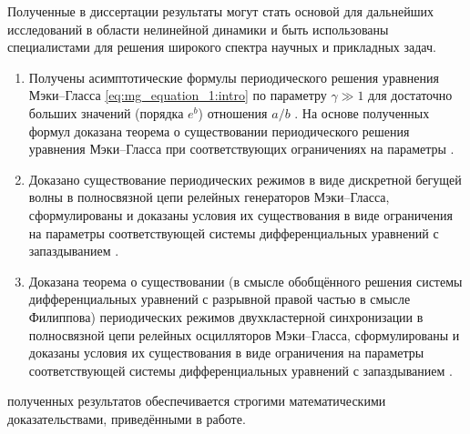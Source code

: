 {\influence} Полученные в диссертации результаты могут стать основой для дальнейших исследований в области нелинейной динамики и быть использованы специалистами для решения широкого спектра научных и прикладных задач.

{}
\begin{enumerate}[beginpenalty=10000] %
	\item Получены асимптотические формулы периодического решения уравнения Мэки--Гласса \eqref{eq:mg_equation_1:intro} по параметру $\gamma \gg 1$ для достаточно больших значений (порядка $e^b$) отношения $a / b$ \cite[Теорема 5.6]{wosbib1}. На основе полученных формул доказана теорема о существовании периодического решения уравнения Мэки--Гласса при соответствующих ограничениях на параметры \cite[Теорема 3.2]{wosbib1}.
	\item Доказано существование периодических режимов в виде дискретной бегущей волны в полносвязной цепи релейных генераторов Мэки--Гласса, сформулированы и доказаны условия их существования в виде ограничения на параметры соответствующей системы дифференциальных уравнений с запаздыванием \cite[Th. 16]{wosbib2}.
	\item Доказана теорема о существовании (в смысле обобщённого решения системы дифференциальных уравнений с разрывной правой частью в смысле Филиппова) периодических режимов двухкластерной синхронизации в полносвязной цепи релейных осцилляторов Мэки--Гласса, сформулированы и доказаны условия их существования в виде ограничения на параметры соответствующей системы дифференциальных уравнений с запаздыванием \cite[Th. 5.2]{scbib1}.
\end{enumerate}


{\reliability} полученных результатов обеспечивается строгими математическими доказательствами, приведёнными в работе. %

\nocite{scbib1, wosbib1, wosbib2}


